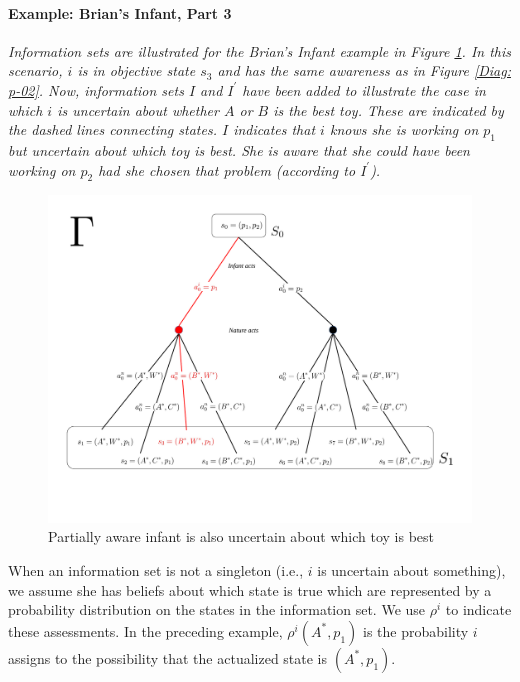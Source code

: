 \documentclass[
11pt,
titlepage,
reqno,
]{article}%
\theoremstyle{definition}
\begin{document}
\paragraph{Example: Brian's Infant, Part 3}	
{\em
Information sets are illustrated for the Brian's Infant example in Figure \ref{Diag: p-03}. 
In this scenario, $i$ is in objective state $s_{3}$ and has the same awareness as in Figure \ref{Diag: p-02}. 
Now, information sets $I$ and $I^\prime$ have been added to illustrate the case in which $i$ is uncertain about whether $A$ or $B$ is the best toy.
These are indicated by the dashed lines connecting states. 
$I$ indicates that $i$ knows she is working on $p_1$ but uncertain about which toy is best.
She is aware that she could have been working on $p_2$ had she chosen that problem (according to $I^\prime$).
	
\begin{figure}[h!]
	\centering
	\includegraphics*[page=3,trim = 0in 6in 6in 0in,scale=.8]{Awareness_Diagrams_All}
	\caption{Partially aware infant is also uncertain about which toy is best\label{Diag: p-03}}%
\end{figure}
}	
When an information set is not a singleton (i.e., $i$ is uncertain about something), we assume she has beliefs about which state is true which are represented by a probability distribution on the states in the information set. 
We use $\rho^i$ to indicate these assessments. 
In the preceding example, $\rho^i(A^\ast,p_1)$ is the probability $i$ assigns to the possibility that the actualized state is $(A^\ast,p_1)$.
	
\end{document}
